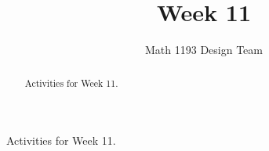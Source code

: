 \documentclass[noauthor]{ximera}
\title{Week 11}
\author{Math 1193 Design Team}
\begin{document}
\begin{abstract}
    Activities for Week 11.
\end{abstract}
\maketitle

Activities for Week 11.
\end{document}
